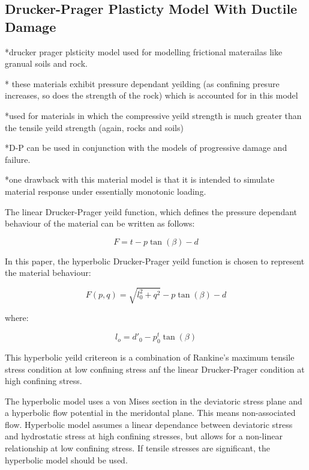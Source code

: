 \subsection{Drucker-Prager Plasticty Model With Ductile Damage}

{*}drucker prager plsticity model used for modelling frictional materailas
like granual soils and rock.\cite{drucker_implications_1950}

{*} these materials exhibit pressure dependant yeilding (as confining
presure increases, so does the strength of the rock) which is accounted
for in this model

{*}used for materials in which the compressive yeild strength is much
greater than the tensile yeild strength (again, rocks and soils)

{*}D-P can be used in conjunction with the models of progressive damage
and failure.

{*}one drawback with this material model is that it is intended to
simulate material response under essentially monotonic loading. 

The linear Drucker-Prager yeild function, which defines the pressure
dependant behaviour of the material can be written as follows:

\begin{equation}
F=t-p\tan\left(\beta\right)-d\label{eqn:druc1}
\end{equation}


In this paper, the hyperbolic Drucker-Prager yeild function is chosen
to represent the material behaviour:

\begin{equation}
F\left(p,q\right)=\sqrt{l_{0}^{2}+q^{2}}-p\tan\left(\beta\right)-d\label{eqn:druc2}
\end{equation}


where:

\begin{equation}
l_{o}=d'_{0}-p_{0}^{t}\tan\left(\beta\right)\label{eqn:druc2-1}
\end{equation}

This hyperbolic yeild critereon is a combination of Rankine's maximum tensile stress condition at low confining stress anf the linear Drucker-Prager condition at high
confining stress.

The hyperbolic model uses a von Mises section in the deviatoric stress
plane and a hyperbolic flow potential in the meridontal plane. This
means non-associated flow. Hyperbolic model assumes a linear dependance
between deviatoric stress and hydrostatic stress at high confining
stresses, but allows for a non-linear relationship at low confining
stress. If tensile stresses are significant, the hyperbolic model
should be used.




